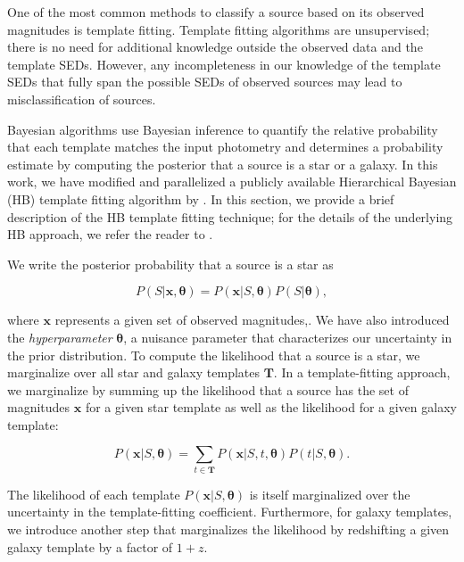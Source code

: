 \documentclass[useAMS,usenatbib]{mn2e}
\begin{document}
One of the most common methods to classify a source
based on its observed magnitudes is template fitting.
Template fitting algorithms are unsupervised;
there is no need for additional knowledge outside the
observed data and the template SEDs.
However, any incompleteness in our knowledge of the template SEDs
that fully span the possible SEDs of observed sources
may lead to misclassification of sources.

Bayesian algorithms use Bayesian inference to quantify
the relative probability that each template matches
the input photometry
and determines a probability estimate by computing
the posterior that a source is a star or a galaxy.
In this work, we have modified and parallelized
a publicly available Hierarchical Bayesian (HB) template fitting
algorithm by \cite{Fadely2012}.
In this section, we provide a brief description
of the HB template fitting technique;
for the details of the underlying HB approach,
we refer the reader to \cite{Fadely2012}.

We write the posterior probability that a source is a star as

\begin{equation}
P \left( S | \mathbf{x}, \mathbf{\theta} \right)
= P \left( \mathbf{x} | S, \mathbf{\theta} \right)
P \left( S | \mathbf{\theta} \right),
\end{equation}

\noindent
where $\mathbf{x}$ represents a given set of observed magnitudes,.
We have also introduced the \textit{hyperparameter} $\mathbf{\theta}$,
a nuisance parameter that characterizes our uncertainty
in the prior distribution.
To compute the likelihood that a source is a star,
we marginalize over all star and galaxy templates $\mathbf{T}$.
In a template-fitting approach,
we marginalize by summing up
the likelihood that a source has the set of magnitudes $\mathbf{x}$
for a given star template
as well as the likelihood for a given galaxy template:

\begin{equation}
  P \left(\mathbf{x} | S, \mathbf{\theta} \right)
  = \sum_{t \in \mathbf{T}}
  P \left(\mathbf{x} | S, t, \mathbf{\theta} \right)
  P \left(t | S, \mathbf{\theta} \right).
  \label{eq:marginalize_template}
\end{equation}

\noindent
The likelihood of each template
$P \left( \mathbf{x} | S, \mathbf{\theta} \right)$
is itself marginalized over the uncertainty
in the template-fitting coefficient.
Furthermore, for galaxy templates, we introduce another step that 
marginalizes the likelihood by redshifting a given galaxy template
by a factor of $1 + z$.
\end{document}
